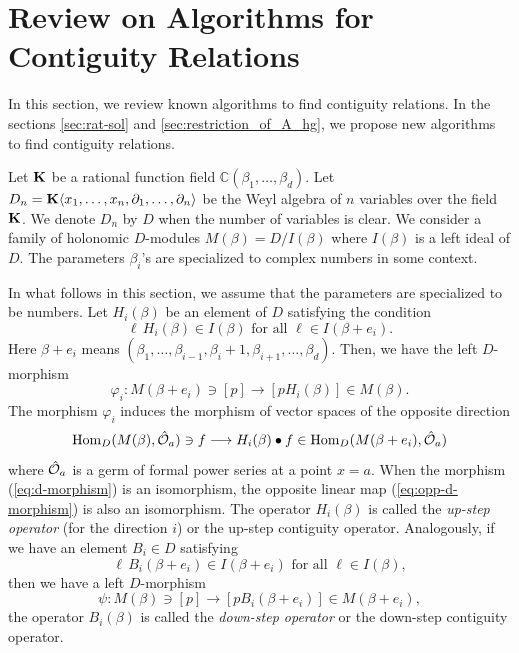\documentclass{article}
\def\CC{\mathbb{C}}
\def\KK{{\bf K}}
\def\pd#1{\partial_{#1}}
\begin{document}
\section{Review on Algorithms for Contiguity Relations} \label{sec:contiguity1}

In this section, we review known algorithms to find contiguity relations.
In the sections \ref{sec:rat-sol} and \ref{sec:restriction_of_A_hg},
we propose new algorithms to find contiguity relations.

Let $\KK$ be a rational function field
$\CC(\beta_1, \ldots, \beta_d)$.
Let 
$D_n=\KK \langle x_1, \ldots, x_n, \pd{1}, \ldots, \pd{n} \rangle$ 
be the Weyl algebra of $n$ variables over the field $\KK$.
We denote $D_n$  by $D$ when the number of variables is clear. 
We consider a family of holonomic $D$-modules $M(\beta)=D/I(\beta)$
where $I(\beta)$ is a left ideal of $D$.
The parameters $\beta_i$'s are specialized to complex numbers
in some context.

In what follows in this section, we assume that the parameters are
specialized to be numbers.
Let $H_i(\beta)$ be an element of $D$
satisfying the condition
\begin{equation}  \label{eq:H-relation}
 \ell \, H_i(\beta) \in I(\beta) \mbox{ for all $\ell \in I(\beta+e_i)$}.
\end{equation}
Here $\beta+e_i$ means $(\beta_1, \ldots, \beta_{i-1},\beta_i+1,\beta_{i+1}, \ldots, \beta_d)$.
Then, we have the left $D$-morphism
\begin{equation} \label{eq:d-morphism}
 \varphi_i : M(\beta+e_i)  \ni [p] \longrightarrow [p H_i(\beta)] \in M(\beta).
\end{equation}
The morphism $\varphi_i$ induces the morphism of vector spaces of the opposite direction
\begin{equation} \label{eq:opp-d-morphism}
 {\rm Hom}_D(M(\beta),{\hat {\cal O}}_a) \ni f \longrightarrow H_i(\beta) \bullet f \in {\rm Hom}_D(M(\beta+e_i),{\hat {\cal O}}_a)
\end{equation}
where ${\hat {\cal O}}_a$ is a germ of formal power series at a point $x=a$.
When the morphism (\ref{eq:d-morphism}) is an isomorphism,
the opposite linear map (\ref{eq:opp-d-morphism}) is also an isomorphism.
The operator $H_i(\beta)$ is called the {\it up-step operator} (for the direction $i$)
or the up-step contiguity operator.
Analogously, if we have an element $B_i \in D$
satisfying
\begin{equation} \label{eq:B-relation}
 \ell \, B_i(\beta+e_i) \in I(\beta+e_i) \mbox{ for all $\ell \in I(\beta)$},
\end{equation}
then we have a left $D$-morphism
\begin{equation} \label{eq:d-morphism-down}
 \psi : M(\beta)  \ni [p] \longrightarrow [p B_i(\beta+e_i)] \in M(\beta+e_i),
\end{equation}
the operator $B_i(\beta)$ is called the {\it down-step operator} 
or the down-step contiguity operator.
\end{document}
